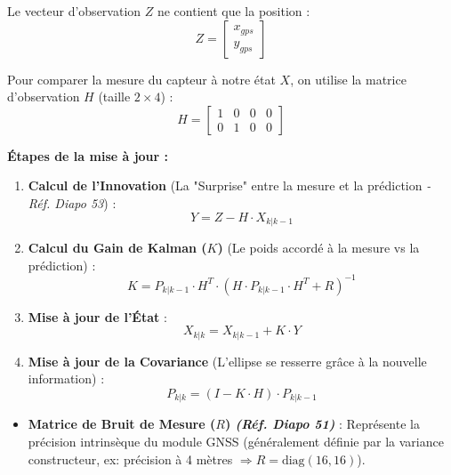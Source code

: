 Le vecteur d'observation $Z$ ne contient que la position :
\begin{equation}
Z = \begin{bmatrix} x_{gps} \\ y_{gps} \end{bmatrix}
\end{equation}

Pour comparer la mesure du capteur à notre état $X$, on utilise la matrice d'observation $H$ (taille $2 \times 4$) :
\begin{equation}
H = \begin{bmatrix} 1 & 0 & 0 & 0 \\ 0 & 1 & 0 & 0 \end{bmatrix}
\end{equation}

\textbf{Étapes de la mise à jour :}
\begin{enumerate}
    \item \textbf{Calcul de l'Innovation} (La "Surprise" entre la mesure et la prédiction \textit{- Réf. Diapo 53}) :
    \begin{equation}
    Y = Z - H \cdot X_{k|k-1}
    \end{equation}
    \item \textbf{Calcul du Gain de Kalman ($K$)} (Le poids accordé à la mesure vs la prédiction) :
    \begin{equation}
    K = P_{k|k-1} \cdot H^T \cdot (H \cdot P_{k|k-1} \cdot H^T + R)^{-1}
    \end{equation}
    \item \textbf{Mise à jour de l'État} :
    \begin{equation}
    X_{k|k} = X_{k|k-1} + K \cdot Y
    \end{equation}
    \item \textbf{Mise à jour de la Covariance} (L'ellipse se resserre grâce à la nouvelle information) :
    \begin{equation}
    P_{k|k} = (I - K \cdot H) \cdot P_{k|k-1}
    \end{equation}
\end{enumerate}

\begin{itemize}
    \item \textbf{Matrice de Bruit de Mesure ($R$) \textit{(Réf. Diapo 51)}} : Représente la précision intrinsèque du module GNSS (généralement définie par la variance constructeur, ex: précision à 4 mètres $\Rightarrow R = \text{diag}(16, 16)$).
\end{itemize}

